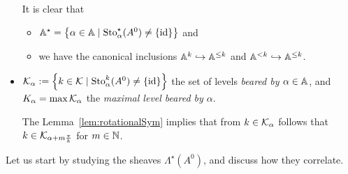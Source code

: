 \begin{notations}
\begin{itemize}
\begin{s-rem}
        It is clear that
        \begin{itemize}
          \item $\mathbb{A}^{\star}=\left\{\alpha\in\mathbb{A}
            \mid\operatorname{Sto}_{\alpha}^\star(A^0)\neq\{\operatorname{id}\}\right\}$ and
          \item we have the canonical inclusions
            $\mathbb{A}^k\hookrightarrow\mathbb{A}^{\leq k}$ and
            $\mathbb{A}^{<k}\hookrightarrow\mathbb{A}^{\leq k}$.
        \end{itemize}
      \end{s-rem}
    \item $\mathcal{K}_\alpha:=\left\{k\in\mathcal{K}\mid\operatorname{Sto}_\alpha^k(A^0)\neq\{\operatorname{id}\}\right\}$
      the set of levels \emph{beared by $\alpha\in\mathbb{A}$}, and
      $K_\alpha=\max\mathcal{K}_\alpha$ the \emph{maximal level beared by $\alpha$}.
      \begin{s-rem}
        The Lemma~\ref{lem:rotationalSym} implies that from $k\in\mathcal{K}_{\alpha}$
        follows that $k\in\mathcal{K}_{\alpha+m\frac{\pi}{k}}$ for $m\in\mathbb{N}$.
      \end{s-rem}
  \end{itemize}
\end{notations}

\begin{comment}
  See \cite[I.5]{Loday1994} on p.\ 861f (See [LR91])
\end{comment}
 Let us start
by studying the sheaves $\Lambda^\star(A^0)$, and discuss how they correlate.


